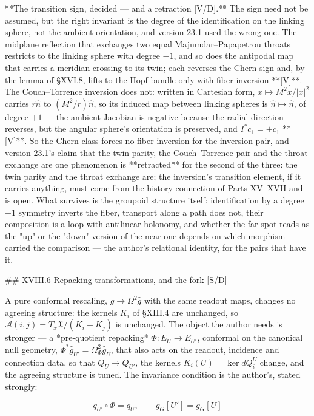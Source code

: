 **The transition sign, decided — and a retraction [V/D].** The sign need not be assumed, but the right invariant is the degree of the identification on the linking sphere, not the ambient orientation, and version 23.1 used the wrong one. The midplane reflection that exchanges two equal Majumdar–Papapetrou throats restricts to the linking sphere with degree $-1$, and so does the antipodal map that carries a meridian crossing to its twin; each reverses the Chern sign and, by the lemma of §XVI.8, lifts to the Hopf bundle only with fiber inversion **[V]**. The Couch–Torrence inversion does not: written in Cartesian form, $x\mapsto M^2x/|x|^2$ carries $r\hat n$ to $(M^2/r)\hat n$, so its induced map between linking spheres is $\hat n\mapsto\hat n$, of degree $+1$ — the ambient Jacobian is negative because the radial direction reverses, but the angular sphere's orientation is preserved, and $I^*c_1 = +c_1$ **[V]**. So the Chern class forces no fiber inversion for the inversion pair, and version 23.1's claim that the twin parity, the Couch–Torrence pair and the throat exchange are one phenomenon is **retracted** for the second of the three: the twin parity and the throat exchange are; the inversion's transition element, if it carries anything, must come from the history connection of Parts XV–XVII and is open. What survives is the groupoid structure itself: identification by a degree $-1$ symmetry inverts the fiber, transport along a path does not, their composition is a loop with antilinear holonomy, and whether the far spot reads as the "up" or the "down" version of the near one depends on which morphism carried the comparison — the author's relational identity, for the pairs that have it.

## XVIII.6 Repacking transformations, and the fork [S/D]

A pure conformal rescaling, $\hat g\to\Omega^2\hat g$ with the same readout maps, changes no agreeing structure: the kernels $K_i$ of §XIII.4 are unchanged, so $\mathcal A(i,j) = T_x\mathfrak X/(K_i+K_j)$ is unchanged. The object the author needs is stronger — a *pre-quotient repacking* $\Phi:E_U\to E_{U'}$, conformal on the canonical null geometry, $\Phi^*\hat g_{U'} = \Omega_\Phi^2\hat g_U$, that also acts on the readout, incidence and connection data, so that $Q_U\to Q_{U'}$, the kernels $K_i(U) = \ker dQ_i^U$ change, and the agreeing structure is tuned. The invariance condition is the author's, stated strongly:

$$q_{U'}\circ\Phi = q_U,\qquad g_G[U'] = g_G[U]$$

